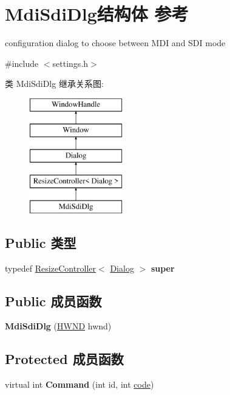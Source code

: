 \hypertarget{struct_mdi_sdi_dlg}{}\section{Mdi\+Sdi\+Dlg结构体 参考}
\label{struct_mdi_sdi_dlg}


configuration dialog to choose between M\+DI and S\+DI mode  




{\ttfamily \#include $<$settings.\+h$>$}

类 Mdi\+Sdi\+Dlg 继承关系图\+:\begin{figure}[H]
\begin{center}
\leavevmode
\includegraphics[height=5.000000cm]{struct_mdi_sdi_dlg}
\end{center}
\end{figure}
\subsection*{Public 类型}
\begin{DoxyCompactItemize}
\item 
\mbox{\label{struct_mdi_sdi_dlg_a6d0616971718412c61a78447bc2b3252}} 
typedef \hyperlink{struct_resize_controller}{Resize\+Controller}$<$ \hyperlink{struct_dialog}{Dialog} $>$ {\bfseries super}
\end{DoxyCompactItemize}
\subsection*{Public 成员函数}
\begin{DoxyCompactItemize}
\item 
\mbox{\label{struct_mdi_sdi_dlg_a2f6ddeb2756027928f8aaebee9246750}} 
{\bfseries Mdi\+Sdi\+Dlg} (\hyperlink{interfacevoid}{H\+W\+ND} hwnd)
\end{DoxyCompactItemize}
\subsection*{Protected 成员函数}
\begin{DoxyCompactItemize}
\item 
\mbox{\label{struct_mdi_sdi_dlg_a93c96fc0c0c75fbb5e7a83641806d2aa}} 
virtual int {\bfseries Command} (int id, int \hyperlink{structcode}{code})
\end{DoxyCompactItemize}
